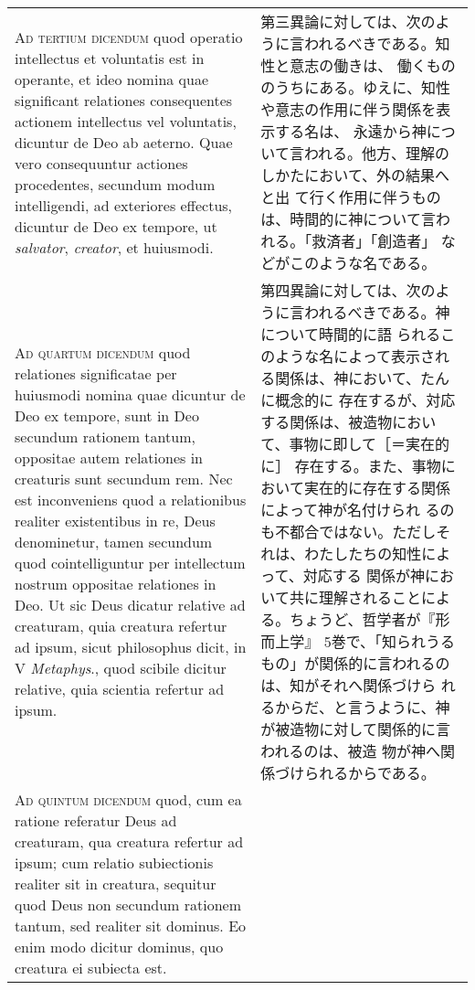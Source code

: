 \documentclass[paper=a4paper,fontsize=10pt,jafontsize=9pt,titlepage]{jlreq}
\begin{document}
\begin{longtable}{p{21em}p{21em}}
\\

{\scshape Ad tertium dicendum} quod operatio intellectus et voluntatis
est in operante, et ideo nomina quae significant relationes
consequentes actionem intellectus vel voluntatis, dicuntur de Deo ab
aeterno. Quae vero consequuntur actiones procedentes, secundum modum
intelligendi, ad exteriores effectus, dicuntur de Deo ex tempore, ut
{\itshape salvator}, {\itshape creator}, et huiusmodi.

&

第三異論に対しては、次のように言われるべきである。知性と意志の働きは、
働くもののうちにある。ゆえに、知性や意志の作用に伴う関係を表示する名は、
永遠から神について言われる。他方、理解のしかたにおいて、外の結果へと出
て行く作用に伴うものは、時間的に神について言われる。「救済者」「創造者」
などがこのような名である。

\\

{\scshape Ad quartum dicendum} quod relationes significatae per
huiusmodi nomina quae dicuntur de Deo ex tempore, sunt in Deo secundum
rationem tantum, oppositae autem relationes in creaturis sunt secundum
rem. Nec est inconveniens quod a relationibus realiter existentibus in
re, Deus denominetur, tamen secundum quod cointelliguntur per
intellectum nostrum oppositae relationes in Deo. Ut sic Deus dicatur
relative ad creaturam, quia creatura refertur ad ipsum, sicut
philosophus dicit, in V {\itshape Metaphys}., quod scibile dicitur
relative, quia scientia refertur ad ipsum.

&

第四異論に対しては、次のように言われるべきである。神について時間的に語
られるこのような名によって表示される関係は、神において、たんに概念的に
存在するが、対応する関係は、被造物において、事物に即して［＝実在的に］
存在する。また、事物において実在的に存在する関係によって神が名付けられ
るのも不都合ではない。ただしそれは、わたしたちの知性によって、対応する
関係が神において共に理解されることによる。ちょうど、哲学者が『形而上学』
5巻で、「知られうるもの」が関係的に言われるのは、知がそれへ関係づけら
れるからだ、と言うように、神が被造物に対して関係的に言われるのは、被造
物が神へ関係づけられるからである。

\\

{\scshape Ad quintum dicendum} quod, cum ea ratione referatur Deus ad
creaturam, qua creatura refertur ad ipsum; cum relatio subiectionis
realiter sit in creatura, sequitur quod Deus non secundum rationem
tantum, sed realiter sit dominus. Eo enim modo dicitur dominus, quo
creatura ei subiecta est.


\end{longtable}
\end{document}
